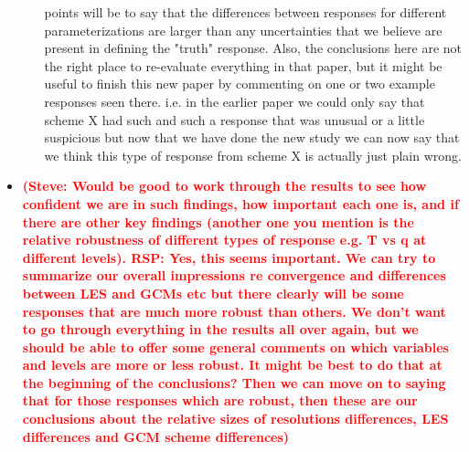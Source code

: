 \documentclass[draft]{agujournal2019}
\newcommand{\todo}[1]{\textcolor{red}{\textbf{(#1)}}}
\begin{document}
\begin{itemize}
\begin{enumerate}
{points will be to say that the differences between responses for different
parameterizations are larger than any uncertainties that we believe are present
in defining the "truth" response. Also, the conclusions here are not the right
place to re-evaluate everything in that paper, but it might be useful to finish
this new paper by commenting on one or two example responses seen there. i.e. in
the earlier paper we could only say that scheme X had such and such a response
that was unusual or a little suspicious but now that we have done the new study
we can now say that we think this type of response from scheme X is actually
just plain wrong.}
\end{enumerate}
\item \todo{Steve: Would be good to work through the results to see how
confident we are in such findings, how important each one is, and if there are
other key findings (another one you mention is the relative robustness of
different types of response e.g. T vs q at different levels). RSP: Yes, this
seems important. We can try to summarize our overall impressions re convergence
and differences between LES and GCMs etc but there clearly will be some
responses that are much more robust than others. We don't want to go through
everything in the results all over again, but we should be able to offer some
general comments on which variables and levels are more or less robust. It might
be best to do that at the beginning of the conclusions? Then we can move on to
saying that for those responses which are robust, then these are our conclusions
about the relative sizes of resolutions differences, LES differences and GCM
scheme differences}
\end{itemize}

%
%


\end{document}
